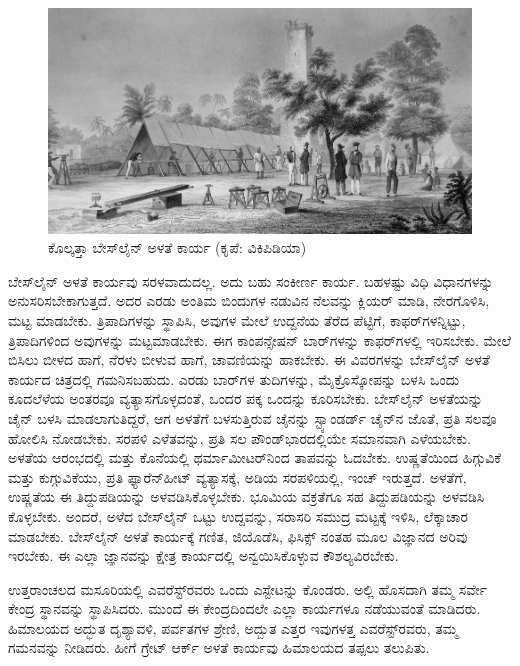 \begin{figure}[!hbtp]
\includegraphics{"images/image014.jpg"}
\caption{ಕೊಲ್ಕತ್ತಾ ಬೇಸ್‌ಲೈನ್​ ಅಳತೆ ಕಾರ್ಯ (ಕೃಪೆ: ವಿಕಿಪಿಡಿಯಾ)}\label{art11-fig2}
\end{figure}

ಬೇಸ್‌ಲೈನ್​ ಅಳತೆ ಕಾರ್ಯವು ಸರಳವಾದುದಲ್ಲ. ಅದು ಬಹು ಸಂಕೀರ್ಣ ಕಾರ್ಯ. ಬಹಳಷ್ಟು ವಿಧಿ ವಿಧಾನಗಳನ್ನು ಅನುಸರಿಸಬೇಕಾಗುತ್ತದೆ. ಅದರ ಎರಡು ಅಂತಿಮ ಬಿಂದುಗಳ ನಡುವಿನ ನೆಲವನ್ನು ಕ್ಲಿಯರ್​ ಮಾಡಿ, ನೇರಗೊಳಿಸಿ, ಮಟ್ಟ ಮಾಡಬೇಕು. ತ್ರಿಪಾದಿಗಳನ್ನು ಸ್ಥಾಪಿಸಿ, ಅವುಗಳ ಮೇಲೆ ಉದ್ದನೆಯ ತೆರೆದ ಪೆಟ್ಟಿಗೆ, ಕಾಫರ್​ಗಳನ್ನಿಟ್ಟು, ತ್ರಿಪಾದಿಗಳಿಂದ ಅವುಗಳನ್ನು ಮಟ್ಟಮಾಡಬೇಕು. ಈಗ ಕಾಂಪನ್ಸೇಷನ್​ ಬಾರ್​ಗಳನ್ನು ಕಾಫರ್​ಗಳಲ್ಲಿ ಇರಿಸಬೇಕು. ಮೇಲೆ ಬಿಸಿಲು ಬೀಳದ ಹಾಗೆ, ನೆರಳು ಬೀಳುವ ಹಾಗೆ, ಚಾವಣಿಯನ್ನು ಹಾಕಬೇಕು. ಈ ವಿವರಗಳನ್ನು ಬೇಸ್‌ಲೈನ್​ ಅಳತೆ ಕಾರ್ಯದ ಚಿತ್ರದಲ್ಲಿ ಗಮನಿಸಬಹುದು. ಎರಡು ಬಾರ್​ಗಳ ತುದಿಗಳನ್ನು, ಮೈಕ್ರೊಸ್ಕೋಪನ್ನು ಬಳಸಿ ಒಂದು ಕೂದಲೆಳೆಯ ಅಂತರವೂ ವ್ಯತ್ಯಾಸಗೊಳ್ಳದಂತೆ, ಒಂದರ ಪಕ್ಕ ಒಂದನ್ನು ಕೂರಿಸಬೇಕು. ಬೇಸ್‌ಲೈನ್​ ಅಳತೆಯನ್ನು ಚೈನ್​ ಬಳಸಿ ಮಾಡಲಾಗುತಿದ್ದರೆ, ಆಗ ಅಳತೆಗೆ ಬಳಸುತ್ತಿರುವ ಚೈನನ್ನು ಸ್ಟ್ಯಾಂಡರ್ಡ್ ಚೈನ್​ನ ಜೊತೆ, ಪ್ರತಿ ಸಲವೂ ಹೋಲಿಸಿ ನೋಡಬೇಕು. ಸರಪಳಿ ಎಳೆತವನ್ನು, ಪ್ರತಿ ಸಲ  ಪೌಂಡ್​ ಭಾರದಲ್ಲಿಯೇ ಸಮಾನವಾಗಿ ಎಳೆಯಬೇಕು. ಅಳತೆಯ ಆರಂಭದಲ್ಲಿ ಮತ್ತು ಕೊನೆಯಲ್ಲಿ ಥರ್ಮಾಮೀಟರ್​ನಿಂದ ತಾಪವನ್ನು ಓದಬೇಕು. ಉಷ್ಣತೆಯಿಂದ ಹಿಗ್ಗುವಿಕೆ ಮತ್ತು ಕುಗ್ಗುವಿಕೆಯು, ಪ್ರತಿ ಫ್ಯಾರೆನ್​ಹೀಟ್​ ವ್ಯತ್ಯಾಸಕ್ಕೆ,  ಅಡಿಯ ಸರಪಳಿಯಲ್ಲಿ,  ಇಂಚ್​ ಇರುತ್ತದೆ. ಅಳತೆಗೆ, ಉಷ್ಣತೆಯ ಈ ತಿದ್ದುಪಡಿಯನ್ನು ಅಳವಡಿಸಿಕೊಳ್ಳಬೇಕು. ಭೂಮಿಯ ವಕ್ರತೆಗೂ ಸಹ ತಿದ್ದುಪಡಿಯನ್ನು ಅಳವಡಿಸಿ ಕೊಳ್ಳಬೇಕು. ಅಂದರೆ, ಅಳೆದ ಬೇಸ್‌ಲೈನ್​ ಒಟ್ಟು ಉದ್ದವನ್ನು, ಸರಾಸರಿ ಸಮುದ್ರ ಮಟ್ಟಕ್ಕೆ ಇಳಿಸಿ, ಲೆಕ್ಕಾಚಾರ ಮಾಡಬೇಕು. ಬೇಸ್‌ಲೈನ್​ ಅಳತೆ ಕಾರ್ಯಕ್ಕೆ ಗಣಿತ, ಜಿಯೊಡೆಸಿ, ಫಿಸಿಕ್ಸ್​ ನಂತಹ ಮೂಲ ವಿಜ್ಞಾನದ ಅರಿವು ಇರಬೇಕು. ಈ ಎಲ್ಲಾ ಜ್ಞಾನವನ್ನು ಕ್ಷೇತ್ರ ಕಾರ್ಯದಲ್ಲಿ ಅನ್ವಯಿಸಿಕೊಳ್ಳುವ ಕೌಶಲ್ಯವಿರಬೇಕು.

ಉತ್ತರಾಂಚಲದ ಮಸೂರಿಯಲ್ಲಿ ಎವರೆಸ್ಟ್​ರವರು ಒಂದು ಎಸ್ಟೇಟನ್ನು ಕೊಂಡರು. ಅಲ್ಲಿ ಹೊಸದಾಗಿ ತಮ್ಮ ಸರ್ವೇ ಕೇಂದ್ರ ಸ್ಥಾನವನ್ನು ಸ್ಥಾಪಿಸಿದರು. ಮುಂದೆ ಈ ಕೇಂದ್ರದಿಂದಲೇ ಎಲ್ಲಾ ಕಾರ್ಯಗಳೂ ನಡೆಯುವಂತೆ ಮಾಡಿದರು. ಹಿಮಾಲಯದ ಅದ್ಭುತ ದೃಶ್ಯಾವಳಿ, ಪರ್ವತಗಳ ಶ್ರೇಣಿ, ಅದ್ಬುತ ಎತ್ತರ ಇವುಗಳತ್ತ ಎವರೆಸ್ಟ್​ರವರು, ತಮ್ಮ ಗಮನವನ್ನು ನೀಡಿದರು. ಹೀಗೆ ಗ್ರೇಟ್​ ಆರ್ಕ್ ಅಳತೆ ಕಾರ್ಯವು ಹಿಮಾಲಯದ ತಪ್ಪಲು ತಲುಪಿತು.

